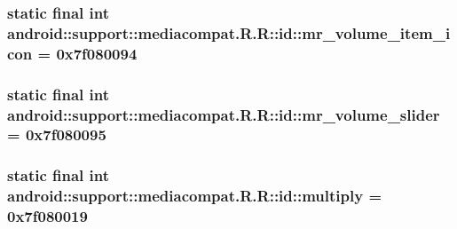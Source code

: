\hypertarget{classandroid_1_1support_1_1mediacompat_1_1_r_1_1id_1f7427293cb57619fe1014b4ea2f5d3e}{
\subsubsection[{mr\_\-volume\_\-item\_\-icon}]{\setlength{\rightskip}{0pt plus 5cm}static final int android::support::mediacompat.R.R::id::mr\_\-volume\_\-item\_\-icon = 0x7f080094}}
\label{classandroid_1_1support_1_1mediacompat_1_1_r_1_1id_1f7427293cb57619fe1014b4ea2f5d3e}


\hypertarget{classandroid_1_1support_1_1mediacompat_1_1_r_1_1id_d060246fac8a6e932b82db57f276c43f}{
\subsubsection[{mr\_\-volume\_\-slider}]{\setlength{\rightskip}{0pt plus 5cm}static final int android::support::mediacompat.R.R::id::mr\_\-volume\_\-slider = 0x7f080095}}
\label{classandroid_1_1support_1_1mediacompat_1_1_r_1_1id_d060246fac8a6e932b82db57f276c43f}


\hypertarget{classandroid_1_1support_1_1mediacompat_1_1_r_1_1id_5100ec76a740d289e3f2725bb31c4e2a}{
\subsubsection[{multiply}]{\setlength{\rightskip}{0pt plus 5cm}static final int android::support::mediacompat.R.R::id::multiply = 0x7f080019}}
\label{classandroid_1_1support_1_1mediacompat_1_1_r_1_1id_5100ec76a740d289e3f2725bb31c4e2a}


